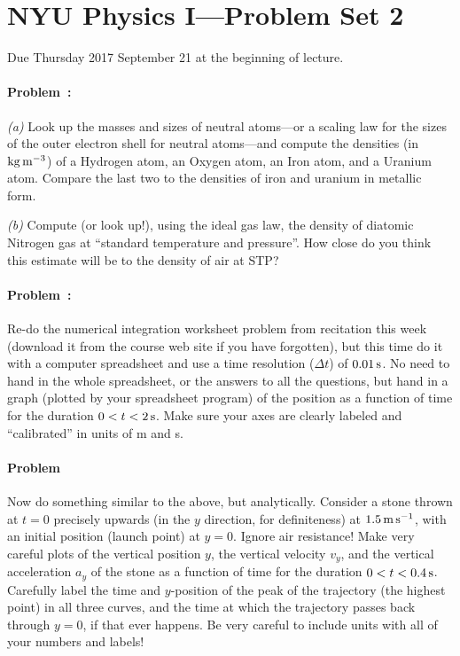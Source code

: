 \documentclass[12pt]{article}
\begin{document}
\section*{NYU Physics I---Problem Set 2}

Due Thursday 2017 September 21 at the beginning of lecture.

\paragraph{Problem~\theproblem:}%
\textsl{(a)} Look up the masses and sizes of neutral atoms---or a
scaling law for the sizes of the outer electron shell for neutral
atoms---and compute the densities (in $\mathrm{kg}\,\mathrm{m}^{-3}$) of a Hydrogen
atom, an Oxygen atom, an Iron atom, and a Uranium atom. Compare the
last two to the densities of iron and uranium in metallic form.

\textsl{(b)} Compute (or look up!), using the ideal gas law, the
density of diatomic Nitrogen gas at ``standard temperature and
pressure''. How close do you think this estimate will be to the
density of air at STP?

\paragraph{Problem~\theproblem:}%
Re-do the numerical integration worksheet problem from recitation this
week (download it from the course web site if you have forgotten), but
this time do it with a computer spreadsheet and use a time resolution
($\Delta t$) of $0.01\,\mathrm{s}$.  No need to hand in the whole spreadsheet,
or the answers to all the questions, but hand in a graph (plotted by
your spreadsheet program) of the position as a function of time for
the duration $0<t<2\,\mathrm{s}$.  Make sure your axes are clearly labeled and
``calibrated'' in units of m and s.

\paragraph{Problem~\theproblem}%
Now do something similar to the above, but analytically.  Consider a
stone thrown at $t=0$ precisely upwards (in the $y$ direction, for
definiteness) at $1.5\,\mathrm{m}\,\mathrm{s}^{-1}$, with an initial position (launch point)
at $y=0$.  Ignore air resistance!  Make very careful plots of the
vertical position $y$, the vertical velocity $v_y$, and the vertical
acceleration $a_y$ of the stone as a function of time for the duration
$0<t<0.4\,\mathrm{s}$.  Carefully label the time and $y$-position of
the peak of the trajectory (the highest point) in all three curves,
and the time at which the trajectory passes back through $y=0$, if
that ever happens. Be very careful to include units with all of your
numbers and labels!
\end{document}
